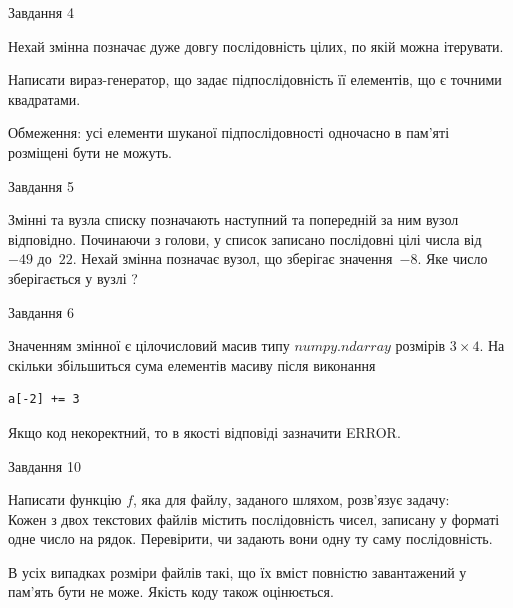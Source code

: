 \documentclass[12pt, ukrainian]{article}
\begin{document}
{               
{\begin{center}Завдання {4}\end{center}}
\vspace{-6mm}
Нехай змінна  позначає дуже довгу послідовність цілих, по якій можна ітерувати.

Написати вираз-генератор, що задає підпослідовність її елементів, що є точними квадратами.

Обмеження: усі елементи шуканої підпослідовності одночасно в пам'яті розміщені бути не можуть.\par

\vspace{10mm}
               
{\begin{center}Завдання {5}\end{center}}
\vspace{-6mm}
Змінні  та  вузла списку позначають наступний та попередній за ним вузол відповідно. Починаючи з голови, у список записано послідовні цілі числа від~$-49$ до~$22$. Нехай змінна  позначає вузол, що зберігає значення~$-8$.
Яке число зберігається у вузлі  ?\par

               
{\begin{center}Завдання {6}\end{center}}
\vspace{-6mm}
Значенням змінної  є цілочисловий масив типу $numpy.ndarray$ розмірів $3{\times}4$. На скільки збільшиться сума елементів масиву  після виконання
\begin{verbatim}
a[-2] += 3
\end{verbatim}


Якщо код некоректний, то в якості відповіді зазначити ERROR.\par

               
{\begin{center}Завдання {10}\end{center}}
\vspace{-6mm}

Написати функцію $f$, яка для файлу, заданого шляхом, розв’язує задачу:\\ Кожен з двох текстових файлів містить послідовність чисел, записану у форматі одне число на рядок.  Перевірити, чи задають вони одну ту саму послідовність.

В усіх випадках розміри файлів такі, що їх вміст повністю завантажений у пам'ять бути не може. Якість коду також оцінюється.



}
\end{document}
